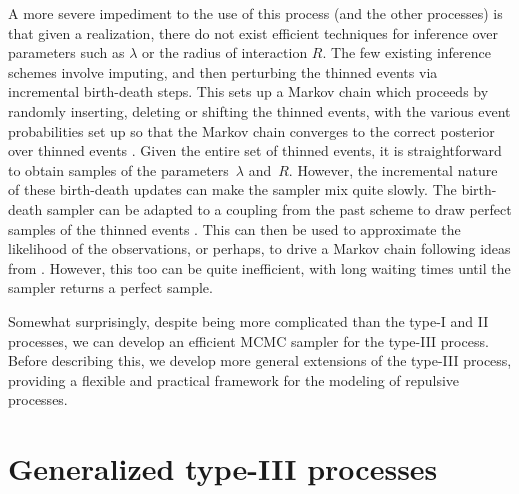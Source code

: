\documentclass{statsoc}
\begin{document}
A more severe impediment to the use of this process (and the other \matern processes) is that given a realization,
there do not exist efficient techniques for inference over parameters 
such as $\lambda$ or the radius of interaction $R$. The few existing inference schemes involve imputing, and then perturbing the 
thinned events via 
incremental birth-death steps. This sets up a Markov chain which proceeds by randomly inserting, deleting or shifting the thinned events, with
the various event probabilities set up so that the Markov chain converges to the correct posterior over thinned events \citep{moller10, Hube:Wolp:2009, adamsthesis}. 
Given the entire set of thinned events, it is straightforward to obtain samples of
the parameters~$\lambda$ and~$R$. However, the incremental nature of these 
birth-death updates can make the sampler mix quite slowly. The birth-death sampler can be adapted to a coupling from
the past scheme to draw perfect samples of the thinned events \citep{Hube:Wolp:2009}. This can then be used to approximate the likelihood of the \matern observations, or perhaps, to 
drive a Markov chain following ideas from \cite{AndRob10}. However, this too can be quite inefficient, 
with long waiting times until the sampler returns a perfect sample.

Somewhat surprisingly, despite being more complicated than the type-I and II processes, 
we can develop an efficient MCMC sampler for the type-III process.
Before describing this, we develop more general extensions of the \matern type-III process, providing a flexible and practical 
framework for the modeling of repulsive processes.


\section{Generalized \matern type-III processes} \label{sec:gen_mat}
\end{document}
